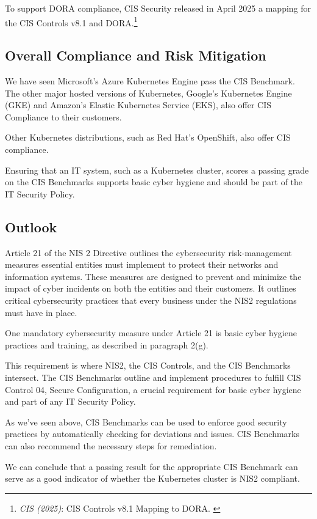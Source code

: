 To support DORA compliance, CIS Security released in April 2025 a mapping for the CIS Controls v8.1 and DORA.\footnote{\textit{CIS (2025)}: CIS Controls v8.1 Mapping to DORA. \cite{cisMapDora}}

\subsection{Overall Compliance and Risk Mitigation}

We have seen Microsoft's Azure Kubernetes Engine pass the CIS Benchmark. The other major hosted versions of Kubernetes, Google's Kubernetes Engine (GKE) and Amazon's Elastic Kubernetes Service (EKS), also offer CIS Compliance to their customers.

Other Kubernetes distributions, such as Red Hat's OpenShift, also offer CIS compliance. 

Ensuring that an IT system, such as a Kubernetes cluster, scores a passing grade on the CIS Benchmarks supports basic cyber hygiene and should be part of the IT Security Policy.

\subsection{Outlook}

Article 21 of the NIS 2 Directive outlines the cybersecurity risk-management measures essential entities must implement to protect their networks and information systems. These measures are designed to prevent and minimize the impact of cyber incidents on both the entities and their customers. It outlines critical cybersecurity practices that every business under the NIS2 regulations must have in place. 

One mandatory cybersecurity measure under Article 21 is basic cyber hygiene practices and training, as described in paragraph 2(g).

This requirement is where NIS2, the CIS Controls, and the CIS Benchmarks intersect. The CIS Benchmarks outline and implement procedures to fulfill CIS Control 04, Secure Configuration, a crucial requirement for basic cyber hygiene and part of any IT Security Policy.

As we've seen above, CIS Benchmarks can be used to enforce good security practices by automatically checking for deviations and issues. CIS Benchmarks can also recommend the necessary steps for remediation.

We can conclude that a passing result for the appropriate CIS Benchmark can serve as a good indicator of whether the Kubernetes cluster is NIS2 compliant.

